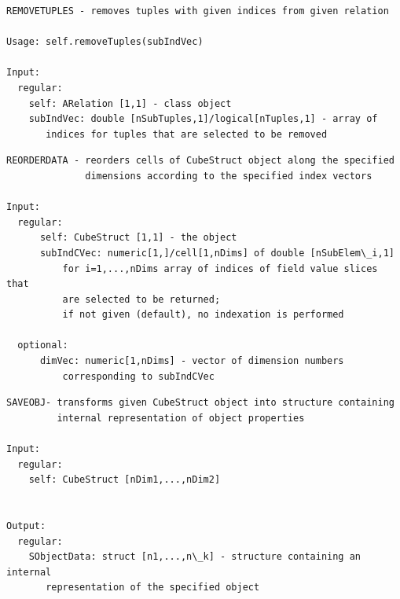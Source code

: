 \documentclass[letterpaper,10pt,english]{sphinxmanual}
\begin{document}
\begin{Verbatim}[commandchars=\\\{\}]
REMOVETUPLES - removes tuples with given indices from given relation

Usage: self.removeTuples(subIndVec)

Input:
  regular:
    self: ARelation [1,1] - class object
    subIndVec: double [nSubTuples,1]/logical[nTuples,1] - array of
       indices for tuples that are selected to be removed
\end{Verbatim}

\begin{Verbatim}[commandchars=\\\{\}]
REORDERDATA - reorders cells of CubeStruct object along the specified
              dimensions according to the specified index vectors

Input:
  regular:
      self: CubeStruct [1,1] - the object
      subIndCVec: numeric[1,]/cell[1,nDims] of double [nSubElem\_i,1]
          for i=1,...,nDims array of indices of field value slices that
          are selected to be returned;
          if not given (default), no indexation is performed

  optional:
      dimVec: numeric[1,nDims] - vector of dimension numbers
          corresponding to subIndCVec
\end{Verbatim}

\begin{Verbatim}[commandchars=\\\{\}]
SAVEOBJ- transforms given CubeStruct object into structure containing
         internal representation of object properties

Input:
  regular:
    self: CubeStruct [nDim1,...,nDim2]


Output:
  regular:
    SObjectData: struct [n1,...,n\_k] - structure containing an internal
       representation of the specified object
\end{Verbatim}
\end{document}
